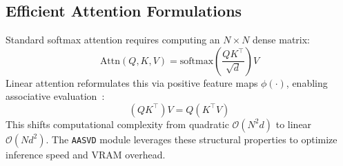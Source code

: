 \subsection{Efficient Attention Formulations}
Standard softmax attention requires computing an $N \times N$ dense matrix:
\[
\text{Attn}(Q, K, V) = \text{softmax}\left(\frac{Q K^\top}{\sqrt{d}}\right) V
\]
Linear attention reformulates this via positive feature maps $\phi(\cdot)$, enabling associative evaluation~\citep{katharopoulos2020, choromanski2021, xiong2021nystromformer}:
\[
(Q K^\top) V = Q (K^\top V)
\]
This shifts computational complexity from quadratic $\mathcal{O}(N^2 d)$ to linear $\mathcal{O}(N d^2)$. The \texttt{AASVD} module leverages these structural properties to optimize inference speed and VRAM overhead.
